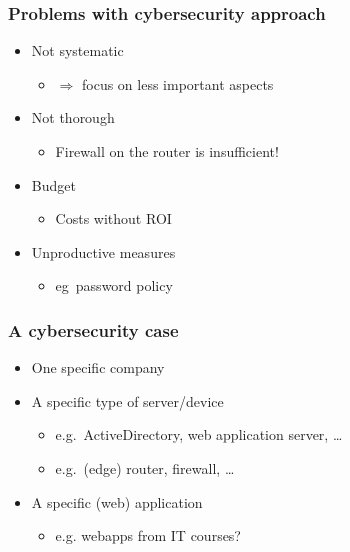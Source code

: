 \documentclass[aspectratio=169]{beamer}
\begin{document}
\begin{frame}
  \frametitle{Problems with cybersecurity approach}

  \begin{itemize}
    \item Not systematic
          \begin{itemize}
            \item $\Rightarrow$ focus on less important aspects
          \end{itemize}
    \item Not thorough
          \begin{itemize}
            \item Firewall on the router is insufficient!
          \end{itemize}
    \item Budget
          \begin{itemize}
            \item Costs without ROI
          \end{itemize}
    \item Unproductive measures
          \begin{itemize}
            \item eg\ password policy
          \end{itemize}
  \end{itemize}

\end{frame}

\begin{frame}
  \frametitle{A cybersecurity case}

  \begin{itemize}
    \item One specific company
    \item A specific type of server/device
          \begin{itemize}
            \item e.g.\ ActiveDirectory, web application server, \ldots
            \item e.g.\ (edge) router, firewall, \ldots
          \end{itemize}
    \item A specific (web) application
          \begin{itemize}
            \item e.g. webapps from IT courses?
          \end{itemize}
  \end{itemize}

\end{frame}
\end{document}
